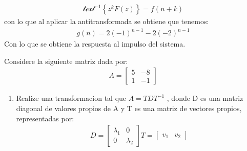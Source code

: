 \documentclass[
  11pt,
  letterpaper,
   addpoints,
   answers
  ]{exam}
\begin{document}
\begin{questions}
\begin{solution}
\begin{align}
            \mathcal{text}^{-1}\left\{z^{k}F(z)\right\}=f(n+k)
        \end{align}
        con lo que al aplicar la antitransformada se obtiene que tenemos:
        \begin{align}
            g(n) = 2(-1)^{n-1}- 2(-2)^{n-1}
        \end{align}
        Con lo que se obtiene la respuesta al impulso del sistema.
    \end{solution}
    \question Considere la siguiente matriz dada por:
    \begin{align}
        A= \begin{bmatrix}
            5 & -8\\
            1 & -1
        \end{bmatrix}
    \end{align}
    \begin{enumerate}
        \item Realize una transformacion tal que $A = TDT^{-1}$ , donde D es una matriz diagonal de valores propios de A y T es una matriz de vectores propios, representadas por:
        \begin{align}
            D = \begin{bmatrix}
                \lambda_{1} & 0\\
                0 & \lambda_{2}
            \end{bmatrix}
            T = \begin{bmatrix}
                v_{1} & v_{2}
            \end{bmatrix}
        \end{align}
    \end{enumerate}
    \begin{solution}

\end{solution}
\end{questions}
\end{document}
